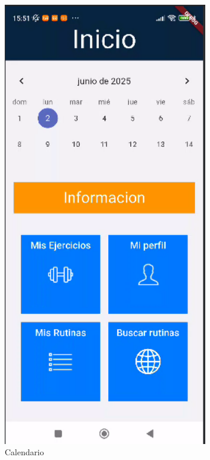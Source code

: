 \begin{figure}[H]
   \centering
    \includegraphics[width=0.8\textwidth]{pantallas/Calendario.png}
    \caption{Calendario}
    \label{fig:Calendario}
\end{figure}

